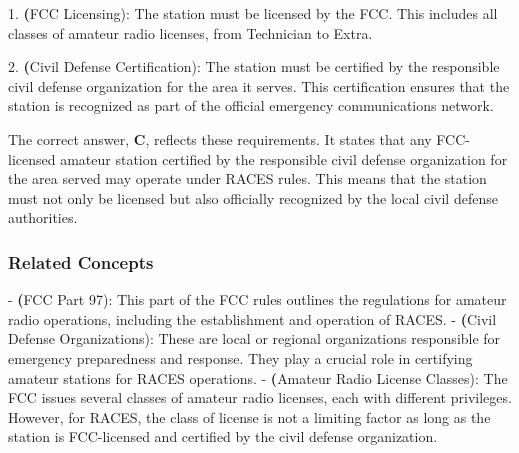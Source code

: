 1. \textbf(FCC Licensing): The station must be licensed by the FCC. This includes all classes of amateur radio licenses, from Technician to Extra.

2. \textbf(Civil Defense Certification): The station must be certified by the responsible civil defense organization for the area it serves. This certification ensures that the station is recognized as part of the official emergency communications network.

The correct answer, \textbf{C}, reflects these requirements. It states that any FCC-licensed amateur station certified by the responsible civil defense organization for the area served may operate under RACES rules. This means that the station must not only be licensed but also officially recognized by the local civil defense authorities.

\subsubsection{Related Concepts}
- \textbf(FCC Part 97): This part of the FCC rules outlines the regulations for amateur radio operations, including the establishment and operation of RACES.
- \textbf(Civil Defense Organizations): These are local or regional organizations responsible for emergency preparedness and response. They play a crucial role in certifying amateur stations for RACES operations.
- \textbf(Amateur Radio License Classes): The FCC issues several classes of amateur radio licenses, each with different privileges. However, for RACES, the class of license is not a limiting factor as long as the station is FCC-licensed and certified by the civil defense organization.

